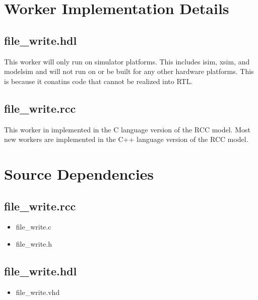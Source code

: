 \documentclass{article}
\def\comp{file\_write}
\begin{document}
\section*{Worker Implementation Details}
\subsection*{\comp.hdl}
\begin{flushleft}
This worker will only run on simulator platforms.  This includes isim, xsim, and modelsim and will not run on or be built for any other hardware platforms.  This is because it conatins code that cannot be realized into RTL.  
\end{flushleft}
\subsection*{\comp.rcc}
\begin{flushleft}
This worker in implemented in the C language version of the RCC model.  Most new workers are implemented in the C++ language version of the RCC model.
\end{flushleft}

\section*{Source Dependencies}
\subsection*{\comp.rcc}
\begin{itemize}
\item file\_write.c
\item file\_write.h 
\end{itemize}
\subsection*{\comp.hdl}
\begin{itemize}
\item file\_write.vhd
\end{itemize}
\end{document}
